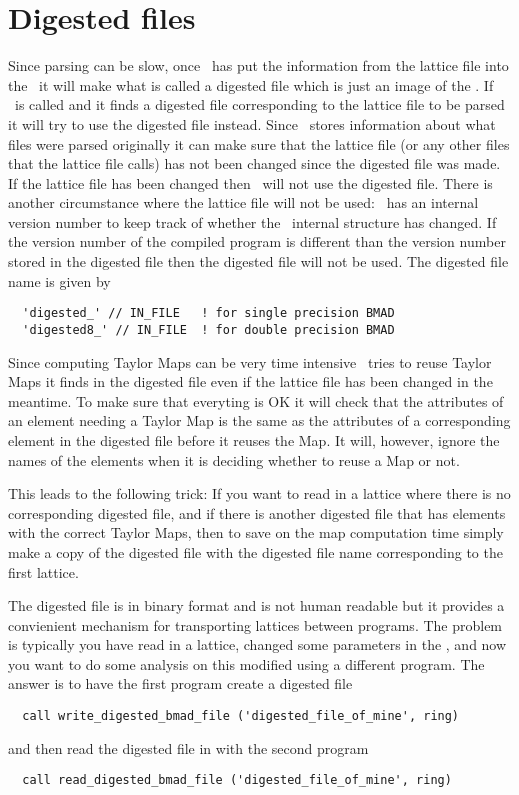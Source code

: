 \section{Digested files}

Since parsing can be slow, once \bmadparser\ has put the information
from the lattice file into the \ringstruct\ it will make what is
called a digested file which is just an image of the \ringstruct.  If
\bmadparser\ is called and it finds a digested file corresponding to
the lattice file to be parsed it will try to use the digested file
instead. Since \bmadparser\ stores information about what files were
parsed originally it can make sure that the lattice file (or any other
files that the lattice file calls) has not been changed since the
digested file was made. If the lattice file has been changed then
\bmadparser\ will not use the digested file. There is another 
circumstance where the lattice file will not be used: \bmad\ has an
internal version number to keep track of whether the \ringstruct\
internal structure has changed. If the version number of the compiled
program is different than the version number stored in the digested
file then the digested file will not be used. The digested file name
is given by
\begin{verbatim}
  'digested_' // IN_FILE   ! for single precision BMAD 
  'digested8_' // IN_FILE  ! for double precision BMAD 
\end{verbatim}

Since computing Taylor Maps can be very time intensive \bmadparser\
tries to reuse Taylor Maps it finds in the digested file even if the
lattice file has been changed in the meantime. To make sure that
everyting is OK it will check that the attributes of an element
needing a Taylor Map is the same as the attributes of a corresponding
element in the digested file before it reuses the Map. It will,
however, ignore the names of the elements when it is deciding whether
to reuse a Map or not. 

This leads to the following trick: If you want to read in a lattice
where there is no corresponding digested file, and if there is another
digested file that has elements with the correct Taylor Maps, then to
save on the map computation time simply make a copy of the digested
file with the digested file name corresponding to the first lattice.

The digested file is in binary format and is not human readable but it
provides a convienient mechanism for transporting lattices between
programs. The problem is typically you have read in a lattice, changed
some parameters in the \ringstruct, and now you want to do some
analysis on this modified \ringstruct using a different program. The 
answer is to have the first program create a digested file
\begin{verbatim}
  call write_digested_bmad_file ('digested_file_of_mine', ring)
\end{verbatim}
and then read the digested file in with the second program
\begin{verbatim}
  call read_digested_bmad_file ('digested_file_of_mine', ring)
\end{verbatim}